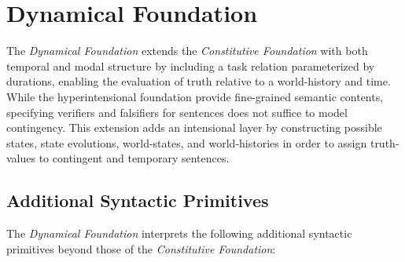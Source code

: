 \documentclass[../LogosReference.tex]{subfiles}
\begin{document}

\section{Dynamical Foundation}\label{sec:dynamical-foundation}

The \textit{Dynamical Foundation} extends the \textit{Constitutive Foundation} with both temporal and modal structure by including a task relation parameterized by durations, enabling the evaluation of truth relative to a world-history and time.
While the hyperintensional foundation provide fine-grained semantic contents, specifying verifiers and falsifiers for sentences does not suffice to model contingency.
This extension adds an intensional layer by constructing possible states, state evolutions, world-states, and world-histories in order to assign truth-values to contingent and temporary sentences.


\subsection{Additional Syntactic Primitives}\label{sec:additional-syntax}

The \textit{Dynamical Foundation} interprets the following additional syntactic primitives beyond those of the \textit{Constitutive Foundation}:


\end{document}

